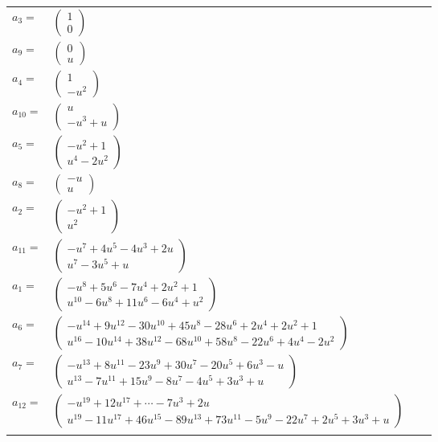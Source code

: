 \documentclass[1p]{elsarticle_modified}
\theoremstyle{definition}
\begin{document}
\begin{tabular}{m{7pt} m{180pt} m{7pt} m{180pt} }
\flushright $a_{3}=$&$\begin{pmatrix}1\\0\end{pmatrix}$ \\
\flushright $a_{9}=$&$\begin{pmatrix}0\\u\end{pmatrix}$ \\
\flushright $a_{4}=$&$\begin{pmatrix}1\\- u^2\end{pmatrix}$ \\
\flushright $a_{10}=$&$\begin{pmatrix}u\\- u^3+u\end{pmatrix}$ \\
\flushright $a_{5}=$&$\begin{pmatrix}- u^2+1\\u^4-2 u^2\end{pmatrix}$ \\
\flushright $a_{8}=$&$\begin{pmatrix}- u\\u\end{pmatrix}$ \\
\flushright $a_{2}=$&$\begin{pmatrix}- u^2+1\\u^2\end{pmatrix}$ \\
\flushright $a_{11}=$&$\begin{pmatrix}- u^7+4 u^5-4 u^3+2 u\\u^7-3 u^5+u\end{pmatrix}$ \\
\flushright $a_{1}=$&$\begin{pmatrix}- u^8+5 u^6-7 u^4+2 u^2+1\\u^{10}-6 u^8+11 u^6-6 u^4+u^2\end{pmatrix}$ \\
\flushright $a_{6}=$&$\begin{pmatrix}- u^{14}+9 u^{12}-30 u^{10}+45 u^8-28 u^6+2 u^4+2 u^2+1\\u^{16}-10 u^{14}+38 u^{12}-68 u^{10}+58 u^8-22 u^6+4 u^4-2 u^2\end{pmatrix}$ \\
\flushright $a_{7}=$&$\begin{pmatrix}- u^{13}+8 u^{11}-23 u^9+30 u^7-20 u^5+6 u^3- u\\u^{13}-7 u^{11}+15 u^9-8 u^7-4 u^5+3 u^3+u\end{pmatrix}$ \\
\flushright $a_{12}=$&$\begin{pmatrix}- u^{19}+12 u^{17}+\cdots-7 u^3+2 u\\u^{19}-11 u^{17}+46 u^{15}-89 u^{13}+73 u^{11}-5 u^9-22 u^7+2 u^5+3 u^3+u\end{pmatrix}$\\&\end{tabular}
\end{document}
